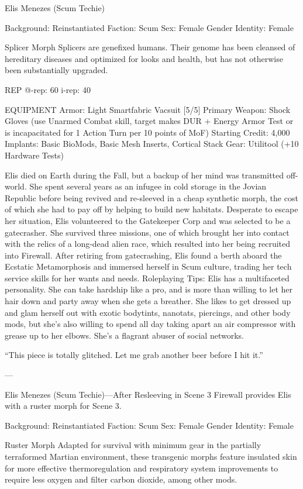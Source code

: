 ﻿Elis Menezes (Scum Techie)

Background: Reinstantiated
Faction: Scum
Sex: Female
Gender Identity: Female

Splicer Morph
Splicers are genefixed humans. Their genome has been cleansed of hereditary diseases and optimized for looks and health, but has not otherwise been substantially upgraded.

REP
@-rep:	60
i-rep:	40

EQUIPMENT
Armor: Light Smartfabric Vacsuit [5/5]
Primary Weapon: Shock Gloves (use Unarmed Combat skill, target makes DUR + Energy Armor Test or is incapacitated for 1 Action Turn per 10 points of MoF)
Starting Credit: 4,000
Implants: Basic BioMods, Basic Mesh Inserts, Cortical Stack
Gear: Utilitool (+10 Hardware Tests)

Elis died on Earth during the Fall, but a backup of her mind was transmitted off-world. She spent several years as an infugee in cold storage in the Jovian Republic before being revived and re-sleeved in a cheap synthetic morph, the cost of which she had to pay off by helping to build new habitats. Desperate to escape her situation, Elis volunteered to the Gatekeeper Corp and was selected to be a gatecrasher. She survived three missions, one of which brought her into contact with the relics of a long-dead alien race, which resulted into her being recruited into Firewall. After retiring from gatecrashing, Elis found a berth aboard the Ecstatic Metamorphosis and immersed herself in Scum culture, trading her tech service skills for her wants and needs.
Roleplaying Tips: Elis has a multifaceted personality. She can take hardship like a pro, and is more than willing to let her hair down and party away when she gets a breather. She likes to get dressed up and glam herself out with exotic bodytints, nanotats, piercings, and other body mods, but she’s also willing to spend all day taking apart an air compressor with grease up to her elbows. She’s a flagrant abuser of social networks. 

“This piece is totally glitched. Let me grab another beer before I hit it.”

---

Elis Menezes (Scum Techie)—After Resleeving in Scene 3
Firewall provides Elis with a ruster morph for Scene 3.

Background: Reinstantiated
Faction: Scum
Sex: Female
Gender Identity: Female

Ruster Morph
Adapted for survival with minimum gear in the partially terraformed Martian environment, these transgenic morphs feature insulated skin for more effective thermoregulation and respiratory system improvements to require less oxygen and filter carbon dioxide, among other mods. 

